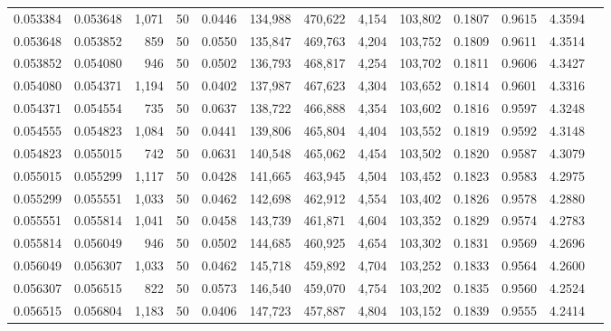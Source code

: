 \begin{tabular}{rrrrrrrrrrrrr}
0.053384 & 0.053648 & 1,071 &  50 &                                     0.0446 & 134,988 & 470,622 &   4,154 & 103,802 & 0.1807 & 0.9615 & 4.3594 \\
0.053648 & 0.053852 &   859 &  50 &                                     0.0550 & 135,847 & 469,763 &   4,204 & 103,752 & 0.1809 & 0.9611 & 4.3514 \\
0.053852 & 0.054080 &   946 &  50 &                                     0.0502 & 136,793 & 468,817 &   4,254 & 103,702 & 0.1811 & 0.9606 & 4.3427 \\
0.054080 & 0.054371 & 1,194 &  50 &                                     0.0402 & 137,987 & 467,623 &   4,304 & 103,652 & 0.1814 & 0.9601 & 4.3316 \\
0.054371 & 0.054554 &   735 &  50 &                                     0.0637 & 138,722 & 466,888 &   4,354 & 103,602 & 0.1816 & 0.9597 & 4.3248 \\
0.054555 & 0.054823 & 1,084 &  50 &                                     0.0441 & 139,806 & 465,804 &   4,404 & 103,552 & 0.1819 & 0.9592 & 4.3148 \\
0.054823 & 0.055015 &   742 &  50 &                                     0.0631 & 140,548 & 465,062 &   4,454 & 103,502 & 0.1820 & 0.9587 & 4.3079 \\
0.055015 & 0.055299 & 1,117 &  50 &                                     0.0428 & 141,665 & 463,945 &   4,504 & 103,452 & 0.1823 & 0.9583 & 4.2975 \\
0.055299 & 0.055551 & 1,033 &  50 &                                     0.0462 & 142,698 & 462,912 &   4,554 & 103,402 & 0.1826 & 0.9578 & 4.2880 \\
0.055551 & 0.055814 & 1,041 &  50 &                                     0.0458 & 143,739 & 461,871 &   4,604 & 103,352 & 0.1829 & 0.9574 & 4.2783 \\
0.055814 & 0.056049 &   946 &  50 &                                     0.0502 & 144,685 & 460,925 &   4,654 & 103,302 & 0.1831 & 0.9569 & 4.2696 \\
0.056049 & 0.056307 & 1,033 &  50 &                                     0.0462 & 145,718 & 459,892 &   4,704 & 103,252 & 0.1833 & 0.9564 & 4.2600 \\
0.056307 & 0.056515 &   822 &  50 &                                     0.0573 & 146,540 & 459,070 &   4,754 & 103,202 & 0.1835 & 0.9560 & 4.2524 \\
0.056515 & 0.056804 & 1,183 &  50 &                                     0.0406 & 147,723 & 457,887 &   4,804 & 103,152 & 0.1839 & 0.9555 & 4.2414 \\

\end{tabular}
